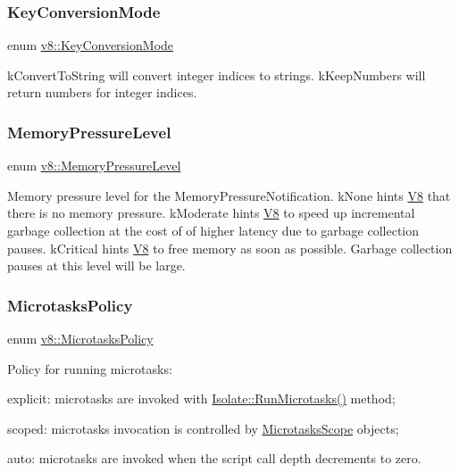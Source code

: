 \subsubsection{\texorpdfstring{Key\+Conversion\+Mode}{KeyConversionMode}}
{\footnotesize\ttfamily enum \mbox{\hyperlink{namespacev8_aa65aeff871614520d8033dead4b34e38}{v8\+::\+Key\+Conversion\+Mode}}\hspace{0.3cm}{\ttfamily [strong]}}

k\+Convert\+To\+String will convert integer indices to strings. k\+Keep\+Numbers will return numbers for integer indices. \mbox{\label{namespacev8_ae0e9a25bf51e518585f555806e7dc7b9}} 
\subsubsection{\texorpdfstring{Memory\+Pressure\+Level}{MemoryPressureLevel}}
{\footnotesize\ttfamily enum \mbox{\hyperlink{namespacev8_ae0e9a25bf51e518585f555806e7dc7b9}{v8\+::\+Memory\+Pressure\+Level}}\hspace{0.3cm}{\ttfamily [strong]}}

Memory pressure level for the Memory\+Pressure\+Notification. k\+None hints \mbox{\hyperlink{classv8_1_1V8}{V8}} that there is no memory pressure. k\+Moderate hints \mbox{\hyperlink{classv8_1_1V8}{V8}} to speed up incremental garbage collection at the cost of of higher latency due to garbage collection pauses. k\+Critical hints \mbox{\hyperlink{classv8_1_1V8}{V8}} to free memory as soon as possible. Garbage collection pauses at this level will be large. \mbox{\label{namespacev8_a2f183b102b3d1b7a30a805e8c53c04da}} 
\subsubsection{\texorpdfstring{Microtasks\+Policy}{MicrotasksPolicy}}
{\footnotesize\ttfamily enum \mbox{\hyperlink{namespacev8_a2f183b102b3d1b7a30a805e8c53c04da}{v8\+::\+Microtasks\+Policy}}\hspace{0.3cm}{\ttfamily [strong]}}

Policy for running microtasks\+:
\begin{DoxyItemize}
\item explicit\+: microtasks are invoked with \mbox{\hyperlink{classv8_1_1Isolate_ac3cbe2a1632eb863912640dcfc98b6c8}{Isolate\+::\+Run\+Microtasks()}} method;
\item scoped\+: microtasks invocation is controlled by \mbox{\hyperlink{classv8_1_1MicrotasksScope}{Microtasks\+Scope}} objects;
\item auto\+: microtasks are invoked when the script call depth decrements to zero. 
\end{DoxyItemize}\mbox{\label{namespacev8_ac9163ab12fb3b2a95907a3a0367c6095}} 
